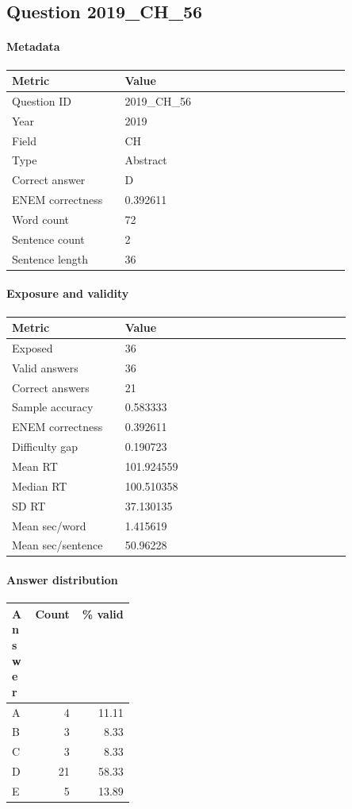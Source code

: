 \subsection*{Question 2019\_CH\_56}
\label{sec:q_2019_CH_56}
\paragraph{Metadata}
\begin{tabular}{p{0.30\linewidth}p{0.60\linewidth}}
\toprule
Metric & Value\\
\midrule
Question ID & 2019\_CH\_56\\
Year & 2019\\
Field & CH\\
Type & Abstract\\
Correct answer & D\\
ENEM correctness & 0.392611\\
Word count & 72\\
Sentence count & 2\\
Sentence length & 36\\
\bottomrule
\end{tabular}

\paragraph{Exposure and validity}
\begin{tabular}{p{0.30\linewidth}p{0.60\linewidth}}
\toprule
Metric & Value\\
\midrule
Exposed & 36\\
Valid answers & 36\\
Correct answers & 21\\
Sample accuracy & 0.583333\\
ENEM correctness & 0.392611\\
Difficulty gap & 0.190723\\
Mean RT & 101.924559\\
Median RT & 100.510358\\
SD RT & 37.130135\\
Mean sec/word & 1.415619\\
Mean sec/sentence & 50.96228\\
\bottomrule
\end{tabular}

\paragraph{Answer distribution}
\begin{tabular}{p{0.18\linewidth}rr}
\toprule
Answer & Count & \% valid\\
\midrule
A & 4 & 11.11\\
B & 3 & 8.33\\
C & 3 & 8.33\\
D & 21 & 58.33\\
E & 5 & 13.89\\
\bottomrule
\end{tabular}

